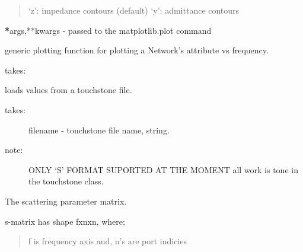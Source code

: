 \documentclass[letterpaper,10pt,english]{sphinxmanual}
\begin{document}
\begin{fulllineitems}
\begin{fulllineitems}
\begin{description}
\begin{quote}
`z': impedance contours (default)
`y': admittance contours
\end{quote}

{\color{red}\bfseries{}*}args,**kwargs - passed to the matplotlib.plot command

\end{description}

\end{fulllineitems}


\begin{fulllineitems}
\label{api/mwavepy:mwavepy.network.Network.plot_vs_frequency_generic}
generic plotting function for plotting a Network's attribute
vs frequency.

takes:

\end{fulllineitems}


\begin{fulllineitems}
\label{api/mwavepy:mwavepy.network.Network.read_touchstone}
loads  values from a touchstone file.
\begin{description}
\item[{takes:}] \leavevmode
filename - touchstone file name, string.

\item[{note: }] \leavevmode
ONLY `S' FORMAT SUPORTED AT THE MOMENT 
all work is tone in the touchstone class.

\end{description}

\end{fulllineitems}


\begin{fulllineitems}
\label{api/mwavepy:mwavepy.network.Network.s}
The scattering parameter matrix.

s-matrix has shape fxnxn, 
where;
\begin{quote}

f is frequency axis and,
n's are port indicies
\end{quote}


\end{fulllineitems}
\end{fulllineitems}
\end{document}
